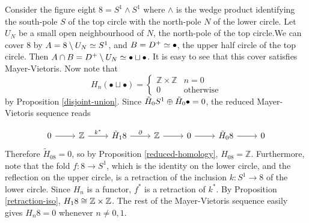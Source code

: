 \begin{example}
Consider the figure eight $8=S^1\wedge S^1$ where $\wedge$ is the wedge product identifying the south-pole $S$ of the top circle with the north-pole $N$ of the lower circle. Let $U_N$ be a small open neighbourhood of $N$, the north-pole of the top circle.We can cover $8$ by $A=8\setminus U_N\simeq S^1$, and $B=D^+\simeq \bullet$, the upper half circle of the top circle. Then $A\cap B= D^+\setminus U_N\simeq \bullet \sqcup \bullet$. It is easy to see that this cover satisfies Mayer-Vietoris. Now note that $$H_n(\bullet \sqcup \bullet)=\begin{cases}\mathbb{Z}\times\mathbb{Z} & n=0\\ 0 & \text{otherwise}\end{cases}$$ by Proposition \ref{disjoint-union}. Since $\tilde{H}_0S^1\oplus \tilde{H}_0\bullet=0$, the reduced Mayer-Vietoris sequence reads 

\[\begin{tikzcd}
0 \arrow[r] & \mathbb{Z} \arrow[r, "k^*"] & \tilde{H}_18 \arrow[r, "\partial"] & \mathbb{Z} \arrow[r] & 0 \arrow[r] & \tilde{H}_08 \arrow[r] & 0
\end{tikzcd}\]
Therefore $\tilde{H}_08=0$, so by Proposition \ref{reduced-homology}, $H_08=\mathbb{Z}$. Furthermore, note that the fold $f:8\rightarrow S^1$, which is the identity on the lower circle, and the reflection on the upper circle, is a retraction of the inclusion $k:S^1\rightarrow 8$ of the lower circle. Since $H_n$ is a functor, $f^*$ is a retraction of $k^*$. By Proposition \ref{retraction-iso}, $H_18\cong \mathbb{Z}\times\mathbb{Z}$. The rest of the Mayer-Vietoris sequence easily gives $H_n8=0$ whenever $n\neq 0,1$.


\end{example}
